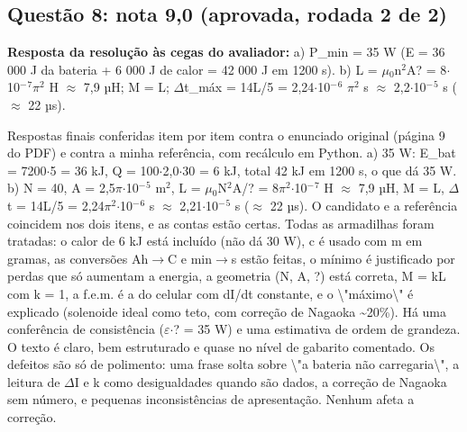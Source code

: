 \documentclass{article}%
\begin{document}
\subsection*{Questão 8: nota 9,0 (aprovada, rodada 2 de 2)}%
\textbf{Resposta da resolução às cegas do avaliador:} a) P\_min = 35 W (E = 36 000 J da bateria + 6 000 J de calor = 42 000 J em 1200 s).\newline%
\newline%
b) L = $\mu$$_{0}$n$^2$A? = 8$\cdot$10$^{-}$$^{7}$$\pi$$^2$ H $\approx$ 7,9 µH; M = L; $\Delta$t\_máx = 14L/5 = 2,24$\cdot$10$^{-}$$^{6}$ $\pi$$^2$ s $\approx$ 2,2$\cdot$10$^{-}$$^{5}$ s ($\approx$ 22 µs).\par %
Respostas finais conferidas item por item contra o enunciado original (página 9 do PDF) e contra a minha referência, com recálculo em Python. a) 35 W: E\_bat = 7200$\cdot$5 = 36 kJ, Q = 100$\cdot$2,0$\cdot$30 = 6 kJ, total 42 kJ em 1200 s, o que dá 35 W. b) N = 40, A = 2,5$\pi$$\cdot$10$^{-}$$^{5}$ m$^2$, L = $\mu$$_{0}$N$^2$A/? = 8$\pi$$^2$$\cdot$10$^{-}$$^{7}$ H $\approx$ 7,9 µH, M = L, $\Delta$t = 14L/5 = 2,24$\pi$$^2$$\cdot$10$^{-}$$^{6}$ s $\approx$ 2,21$\cdot$10$^{-}$$^{5}$ s ($\approx$ 22 µs). O candidato e a referência coincidem nos dois itens, e as contas estão certas. Todas as armadilhas foram tratadas: o calor de 6 kJ está incluído (não dá 30 W), c é usado com m em gramas, as conversões Ah$\to$C e min$\to$s estão feitas, o mínimo é justificado por perdas que só aumentam a energia, a geometria (N, A, ?) está correta, M = kL com k = 1, a f.e.m. é a do celular com dI/dt constante, e o \textbackslash{}"máximo\textbackslash{}" é explicado (solenoide ideal como teto, com correção de Nagaoka \textasciitilde{}20\%). Há uma conferência de consistência ($\varepsilon$$\cdot$? = 35 W) e uma estimativa de ordem de grandeza. O texto é claro, bem estruturado e quase no nível de gabarito comentado. Os defeitos são só de polimento: uma frase solta sobre \textbackslash{}"a bateria não carregaria\textbackslash{}", a leitura de $\Delta$I e k como desigualdades quando são dados, a correção de Nagaoka sem número, e pequenas inconsistências de apresentação. Nenhum afeta a correção.%
\end{document}
